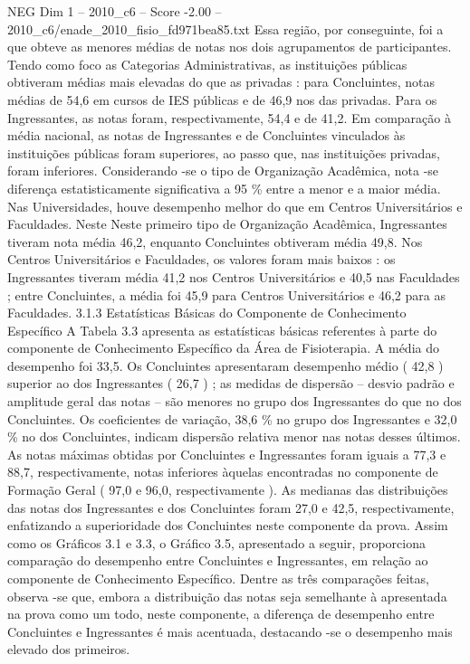 \begin{textsample}{NEG Dim 1 – 2010\_c6 – Score -2.00 – 2010\_c6/enade\_2010\_fisio\_fd971bea85.txt}
Essa região, por conseguinte, foi a que obteve as menores médias de notas nos dois agrupamentos de participantes.
Tendo como foco as Categorias Administrativas, as instituições públicas obtiveram médias mais elevadas do que as privadas : para Concluintes, notas médias de 54,6 em cursos de IES públicas e de 46,9 nos das privadas.
Para os Ingressantes, as notas foram, respectivamente, 54,4 e de 41,2.
Em comparação à média nacional, as notas de Ingressantes e de Concluintes vinculados às instituições públicas foram superiores, ao passo que, nas instituições privadas, foram inferiores.
Considerando -se o tipo de Organização Acadêmica, nota -se diferença estatisticamente significativa a 95 \% entre a menor e a maior média.
Nas Universidades, houve desempenho melhor do que em Centros Universitários e Faculdades.
Neste Neste primeiro tipo de Organização Acadêmica, Ingressantes tiveram nota média 46,2, enquanto Concluintes obtiveram média 49,8.
Nos Centros Universitários e Faculdades, os valores foram mais baixos : os Ingressantes tiveram média 41,2 nos Centros Universitários e 40,5 nas Faculdades ; entre Concluintes, a média foi 45,9 para Centros Universitários e 46,2 para as Faculdades. 3.1.3 Estatísticas Básicas do Componente de Conhecimento Específico A Tabela 3.3 apresenta as estatísticas básicas referentes à parte do componente de Conhecimento Específico da Área de Fisioterapia.
A média do desempenho foi 33,5.
Os Concluintes apresentaram desempenho médio ( 42,8 ) superior ao dos Ingressantes ( 26,7 ) ; as medidas de dispersão – desvio padrão e amplitude geral das notas – são menores no grupo dos Ingressantes do que no dos Concluintes.
Os coeficientes de variação, 38,6 \% no grupo dos Ingressantes e 32,0 \% no dos Concluintes, indicam dispersão relativa menor nas notas desses últimos.
As notas máximas obtidas por Concluintes e Ingressantes foram iguais a 77,3 e 88,7, respectivamente, notas inferiores àquelas encontradas no componente de Formação Geral ( 97,0 e 96,0, respectivamente ).
As medianas das distribuições das notas dos Ingressantes e dos Concluintes foram 27,0 e 42,5, respectivamente, enfatizando a superioridade dos Concluintes neste componente da prova.
Assim como os Gráficos 3.1 e 3.3, o Gráfico 3.5, apresentado a seguir, proporciona comparação do desempenho entre Concluintes e Ingressantes, em relação ao componente de Conhecimento Específico.
Dentre as três comparações feitas, observa -se que, embora a distribuição das notas seja semelhante à apresentada na prova como um todo, neste componente, a diferença de desempenho entre Concluintes e Ingressantes é mais acentuada, destacando -se o desempenho mais elevado dos primeiros.

\end{textsample}
